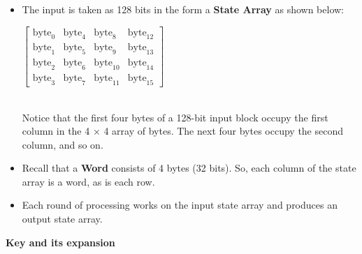 \documentclass[a4paper]{report} %
\begin{document}
\begin{itemize}
    \item The input is taken as 128 bits in the form a \textbf{State Array} as shown below: 
    \begin{center}
    
    $\begin{bmatrix} \text{byte}_0 & \text{byte}_4 & \text{byte}_8 & \text{byte}_{12} \\ \text{byte}_1 & \text{byte}_5 & \text{byte}_9 & \text{byte}_{13} \\ \text{byte}_2 & \text{byte}_6 & \text{byte}_{10} & \text{byte}_{14} \\ \text{byte}_3 & \text{byte}_7 & \text{byte}_{11} & \text{byte}_{15} 
    \end{bmatrix}$
    \end{center}\\
    
    Notice that the first four bytes of a 128-bit input block occupy the first column in the 4 × 4 array of bytes. The next four bytes occupy the second column, and so on. 
    \item Recall that a \textbf{Word} consists of 4 bytes (32 bits). So, each column of the state array is a word, as is each row. 
    \item Each round of processing works on the input state array and produces an output state array. 
\end{itemize}
\begin{center}
    \textbf{Key and its expansion}
\end{center}
\end{document}
